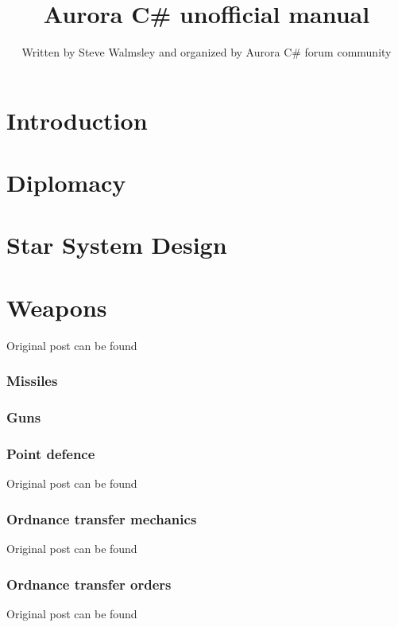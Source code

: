 \documentclass[10pt,a4paper,oneside]{article}
\author{Written by Steve Walmsley and organized by Aurora C\# forum community}
\title{Aurora C\# unofficial manual}
\begin{document}
\maketitle
\newpage
\tableofcontents

\newpage
\part{Introduction}


\newpage
\part{Diplomacy}



\newpage
\part{Star System Design}


\newpage
\part{Weapons}
Original post can be found

\section{Missiles}


\section{Guns}


\section{Point defence}
Original post can be found

\section{Ordnance transfer mechanics}
Original post can be found

\section{Ordnance transfer orders}
Original post can be found
\end{document}
